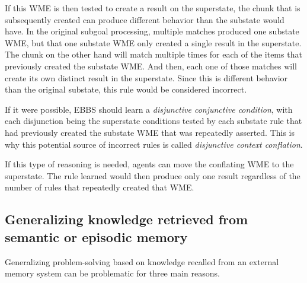 If this WME is then tested to create a result on the superstate, the chunk that is subsequently created can produce different behavior than the substate would have. In the original subgoal processing, multiple matches produced one substate WME, but that one substate WME only created a single result in the superstate.  The chunk on the other hand will match multiple times for each of the items that previously created the substate WME.  And then, each one of those matches will create its own distinct result in the superstate.   Since this is different behavior than the original substate, this rule would be considered incorrect.

If it were possible, EBBS should learn a \textit{disjunctive conjunctive condition}, with each disjunction being the superstate conditions tested by each substate rule that had previously created the substate WME that was repeatedly asserted.  This is why this potential source of incorrect rules is called \textit{disjunctive context conflation}.

If this type of reasoning is needed, agents can move the conflating WME to the superstate.  The rule learned would then produce only one result regardless of the number of rules that repeatedly created that WME.

\subsection{\texorpdfstring{Generalizing knowledge retrieved from \\ semantic or episodic memory}{Generalizing retrieved knowledge}}

Generalizing problem-solving based on knowledge recalled from an external memory system can be problematic for three main reasons.

